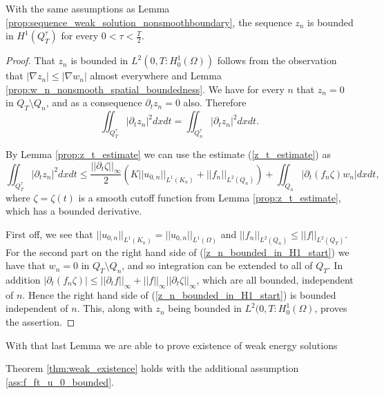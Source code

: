 \documentclass[11pt, a4paper]{article}
\begin{document}
\begin{lemma}
\label{prop:z_n_bounded_in_H1}
With the same assumptions as Lemma \ref{prop:sequence_weak_solution_nonsmoothboundary}, the sequence $z_n$ is bounded in $H^1(Q_T^\tau)$ for every $0 < \tau < \frac{T}{2}$.
\end{lemma}

\begin{proof}
That $z_n$ is bounded in $L^2(0,T: H_0^1(\Omega))$ follows from the observation that $|\nabla z_n| \leq |\nabla w_n|$ almost everywhere and Lemma \ref{prop:w_n_nonsmooth_spatial_boundedness}. We have for every $n$ that $z_n = 0$ in $Q_T\setminus Q_n$, and as a consequence $\partial_t z_n = 0$ also. Therefore
\begin{equation*}
\iint_{Q_T^\tau} |\partial_t z_n|^2 dxdt = \iint_{Q_n^\tau} |\partial_t z_n|^2 dxdt.
\end{equation*} 

By Lemma \ref{prop:z_t_estimate} we can use the estimate (\ref{z_t_estimate}) as
\begin{equation}
\label{z_n_bounded_in_H1_start}
\iint_{Q_T^\tau} |\partial_t z_n|^2 dxdt \leq \frac{||\partial_t \zeta||_\infty}{2}\left( K||u_{0,n}||_{L^1(K_n)} + ||f_n||_{L^2(Q_n)}\right) + \iint_{Q_n}|\partial_t (f_n \zeta ) w_n| dxdt,
\end{equation}
where $\zeta = \zeta(t)$ is a smooth cutoff function from Lemma \ref{prop:z_t_estimate}, which has a bounded derivative.

First off, we see that $||u_{0,n}||_{L^1(K_n)} = ||u_{0,n}||_{L^1(\Omega)}$ and $||f_n||_{L^2(Q_n)} \leq ||f||_{L^2(Q_T)}$. For the second part on the right hand side of (\ref{z_n_bounded_in_H1_start}) we have that $w_n=0$ in $Q_T\setminus Q_n$, and so integration can be extended to all of $Q_T$. In addition $|\partial_t (f_n \zeta)| \leq ||\partial_t f||_{\infty} + ||f||_\infty ||\partial_t \zeta||_\infty$, which are all bounded, independent of $n$. Hence the right hand side of (\ref{z_n_bounded_in_H1_start}) is bounded independent of $n$. This, along with $z_n$ being bounded in $L^2(0,T: H^1_0(\Omega)$, proves the assertion.
\end{proof}

With that last Lemma we are able to prove existence of weak energy solutions

\begin{lemma}
\label{lem:weak_existence_part3}
Theorem \ref{thm:weak_existence} holds with the additional assumption \ref{ass:f_ft_u_0_bounded}.
\end{lemma}
\end{document}
